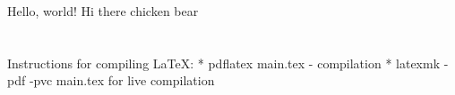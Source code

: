 \documentclass{article}
\begin{document}
Hello, world!
Hi there chicken bear

\section{}
Instructions for compiling LaTeX:
* pdflatex main.tex - compilation
* latexmk -pdf -pvc main.tex for live compilation 
\end{document}
